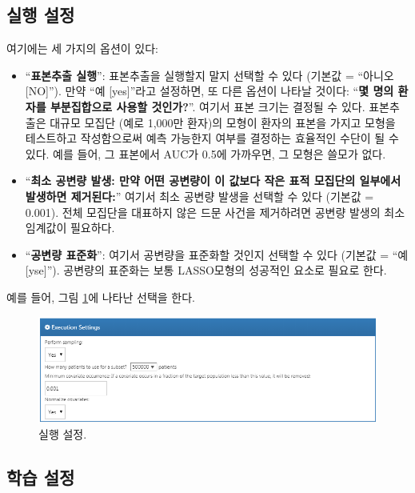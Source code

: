 \documentclass[11pt]{book}
\providecommand{\tightlist}{%
  \setlength{\itemsep}{0pt}\setlength{\parskip}{0pt}}
\theoremstyle{definition}
\theoremstyle{definition}
\theoremstyle{definition}
\theoremstyle{remark}
\begin{document}
\subsection{실행 설정}\label{-}

여기에는 세 가지의 옵션이 있다:

\begin{itemize}
\tightlist
\item
  ``\textbf{표본추출 실행}'': 표본추출을 실행할지 말지 선택할 수 있다
  (기본값 = ``아니오 {[}NO{]}''). 만약 ``예 {[}yes{]}''라고 설정하면, 또
  다른 옵션이 나타날 것이다: ``\textbf{몇 명의 환자를 부분집합으로
  사용할 것인가?}''. 여기서 표본 크기는 결정될 수 있다. 표본추출은
  대규모 모집단 (예로 1,000만 환자)의 모형이 환자의 표본을 가지고 모형을
  테스트하고 작성함으로써 예측 가능한지 여부를 결정하는 효율적인 수단이
  될 수 있다. 예를 들어, 그 표본에서 AUC가 0.5에 가까우면, 그 모형은
  쓸모가 없다.
\item
  ``\textbf{최소 공변량 발생: 만약 어떤 공변량이 이 값보다 작은 표적
  모집단의 일부에서 발생하면 제거된다:}'' 여기서 최소 공변량 발생을
  선택할 수 있다 (기본값 = 0.001). 전체 모집단을 대표하지 않은 드문
  사건을 제거하려면 공변량 발생의 최소 임계값이 필요하다.
\item
  ``\textbf{공변량 표준화}'': 여기서 공변량을 표준화할 것인지 선택할 수
  있다 (기본값 = ``예 {[}yse{]}''). 공변량의 표준화는 보통 LASSO모형의
  성공적인 요소로 필요로 한다.
\end{itemize}

예를 들어, 그림 \ref{fig:executionSettings}에 나타난 선택을 한다.

\begin{figure}

{\centering \includegraphics[width=1\linewidth]{images/PatientLevelPrediction/executionSettings} 

}

\caption{실행 설정.}\label{fig:executionSettings}
\end{figure}

\subsection{학습 설정}\label{-}
\end{document}
